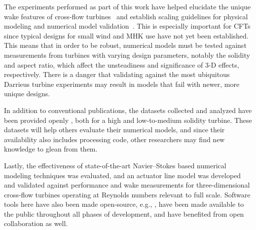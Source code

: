 The experiments performed as part of this work have helped elucidate the unique
wake features of cross-flow turbines~\cite{Bachant2015-JoT} and establish
scaling guidelines for physical modeling and numerical model
validation~\cite{Bachant2016-Energies}. This is especially important for CFTs
since typical designs for small wind and MHK use have not yet been established.
This means that in order to be robust, numerical models must be tested against
measurements from turbines with varying design parameters, notably the solidity
and aspect ratio, which affect the unsteadiness and significance of 3-D effects,
respectively. There is a danger that validating against the most ubiquitous
Darrieus turbine experiments may result in models that fail with newer, more
unique designs.

In addition to conventional publications, the datasets collected and analyzed
have been provided openly \cite{Bachant2014-RVAT-baseline,
    Bachant2016-RVAT-Re-dep, Bachant2016-RM2-data}, both for a high and
low-to-medium solidity turbine. These datasets will help others evaluate their
numerical models, and since their availability also includes processing code,
other researchers may find new knowledge to glean from them.

Lastly, the effectiveness of state-of-the-art Navier--Stokes based numerical
modeling techniques was evaluated, and an actuator line model was developed and
validated against performance and wake measurements for three-dimensional
cross-flow turbines operating at Reynolds numbers relevant to full scale.
Software tools here have also been made open-source, e.g.,
\cite{Bachant2016-turbinesFoam-v0.0.7}, have been made available to the public
throughout all phases of development, and have benefited from open collaboration
as well.
